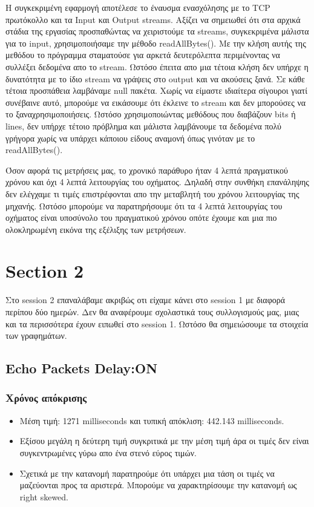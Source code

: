 \documentclass[hidelinks, 12pt, a4paper]{article}
\begin{document}
Η συγκεκριμένη εφαρμογή αποτέλεσε το έναυσμα ενασχόλησης με το TCP πρωτόκολλο και τα Input και Output streams. Αξίζει να σημειωθεί ότι στα αρχικά στάδια της εργασίας προσπαθώντας να χειριστούμε τα streams, συγκεκριμένα μάλιστα για το input, χρησιμοποιήσαμε την μέθοδο readAllBytes(). Με την κλήση αυτής της μεθόδου το πρόγραμμα σταματούσε για αρκετά δευτερόλεπτα περιμένοντας να συλλέξει δεδομένα απο το stream. Ωστόσο έπειτα απο μια τέτοια κλήση δεν υπήρχε η δυνατότητα με το ίδιο stream να γράψεις στο output και να ακούσεις ξανά. Σε κάθε τέτοια προσπάθεια λαμβάναμε null πακέτα. Χωρίς να είμαστε ιδιαίτερα σίγουροι γιατί συνέβαινε αυτό, μπορούμε να εικάσουμε ότι έκλεινε το stream και δεν μπορούσες να το ξαναχρησιμοποιήσεις. Ωστόσο χρησιμοποιώντας μεθόδους που διαβάζουν bits ή lines, δεν υπήρχε τέτοιο πρόβλημα και μάλιστα λαμβάνουμε τα δεδομένα πολύ γρήγορα χωρίς να υπάρχει κάποιου είδους αναμονή όπως γινόταν με το readAllBytes().  

Όσον αφορά τις μετρήσεις μας, το χρονικό παράθυρο ήταν 4 λεπτά πραγματικού χρόνου και όχι 4 λεπτά λειτουργίας του οχήματος. Δηλαδή στην συνθήκη επανάληψης δεν ελέγχαμε τι τιμές επιστρέφονται απο την μεταβλητή του χρόνου λειτουργίας της μηχανής. Ωστόσο μπορούμε να παρατηρήσουμε ότι τα 4 λεπτά λειτουργίας του οχήματος είναι υποσύνολο του πραγματικού χρόνου οπότε έχουμε και μια πιο ολοκληρωμένη εικόνα της εξέλιξης των μετρήσεων. 

\section{Section 2}

Στο session 2 επαναλάβαμε ακριβώς οτι είχαμε κάνει στο session 1 με διαφορά περίπου δύο ημερών. Δεν θα αναφέρουμε σχολαστικά τους συλλογισμούς μας, μιας και τα περισσότερα έχουν ειπωθεί στο session 1. Ωστόσο θα σημειώσουμε τα στοιχεία των γραφημάτων.

\subsection{Echo Packets Delay:ON}
\subsubsection{Χρόνος απόκρισης}
\begin{itemize}
    \item Μέση τιμή: 1271 milliseconds και τυπική απόκλιση: 442.143 milliseconds.
    \item Εξίσου μεγάλη η δεύτερη τιμή συγκριτικά με την μέση τιμή άρα οι τιμές δεν είναι συγκεντρωμένες γύρω απο ένα στενό εύρος τιμών.
    \item Σχετικά με την κατανομή παρατηρούμε ότι υπάρχει μια τάση οι τιμές να μαζεύονται προς τα αριστερά. Μπορούμε να χαρακτηρίσουμε την κατανομή ως right skewed.
\end{itemize}
\end{document}

